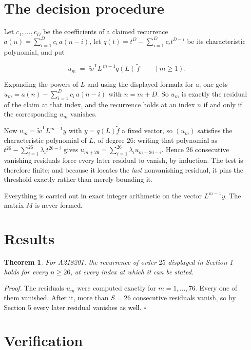 \documentclass[11pt]{article}
\newtheorem{theorem}{Theorem}
\theoremstyle{definition}
\begin{document}
\section{The decision procedure}

Let $c_1,\dots,c_D$ be the coefficients of a claimed recurrence $a(n) = \sum_{i=1}^{D} c_i\,a(n-i)$, let $q(t) = t^{D} - \sum_{i=1}^{D} c_i t^{D-i}$ be its characteristic polynomial, and put

\[u_m \;=\; \tilde w^{\mathsf T} L^{\,m-1} q(L)\,\tilde f \qquad (m \ge 1).\]

Expanding the powers of $L$ and using the displayed formula for $a$, one gets $u_m = a(n) - \sum_{i=1}^{D} c_i\,a(n-i)$ with $n = m + D$. So $u_m$ is exactly the residual of the claim at that index, and the recurrence holds at an index $n$ if and only if the corresponding $u_m$ vanishes.

Now $u_m = \tilde w^{\mathsf T} L^{m-1} y$ with $y = q(L)\tilde f$ a fixed vector, so $(u_m)$ satisfies the characteristic polynomial of $L$, of degree $26$: writing that polynomial as $t^{26} - \sum_{i=1}^{26} \lambda_i t^{26-i}$ gives $u_{m+26} = \sum_{i=1}^{26} \lambda_i u_{m+26-i}$. Hence $26$ consecutive vanishing residuals force every later residual to vanish, by induction. The test is therefore finite; and because it locates the {\itshape last} nonvanishing residual, it pins the threshold exactly rather than merely bounding it.

Everything is carried out in exact integer arithmetic on the vector $L^{m-1}y$. The matrix $M$ is never formed.

\section{Results}

\begin{theorem} For A218201, the recurrence of order $25$ displayed in Section 1 holds for every $n \ge 26$, at every index at which it can be stated.\end{theorem}

{\itshape Proof.} The residuals $u_m$ were computed exactly for $m = 1,\dots,76$. Every one of them vanished. After it, more than $S = 26$ consecutive residuals vanish, so by Section 5 every later residual vanishes as well. $\square$

\section{Verification}
\end{document}
